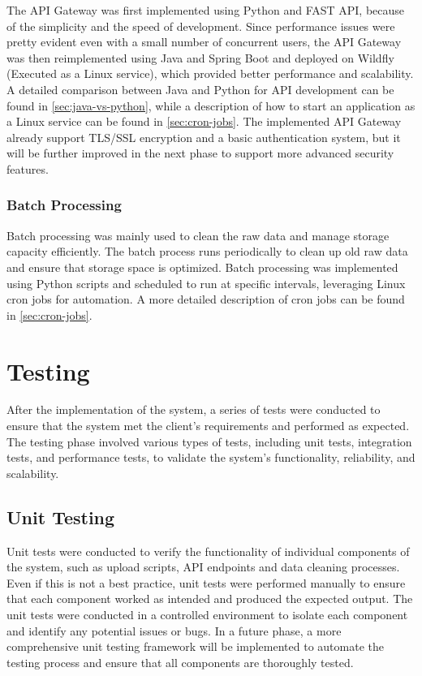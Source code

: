 The API Gateway was first implemented using Python and FAST API, because of the simplicity and the speed of development.
Since performance issues were pretty evident even with a small number of concurrent users, the API Gateway was then reimplemented using Java and Spring Boot and deployed on Wildfly (Executed as a Linux service), which provided better performance and scalability. A detailed comparison between Java and Python for API development can be found in \ref{sec:java-vs-python}, while a description of how to start an application as a Linux service can be found in \ref{sec:cron-jobs}.
The implemented API Gateway already support TLS/SSL encryption and a basic authentication system, but it will be further improved in the next phase to support more advanced security features.

\subsubsection{Batch Processing}
Batch processing was mainly used to clean the raw data and manage storage capacity efficiently. The batch process runs periodically to clean up old raw data and ensure that storage space is optimized. Batch processing was implemented using Python scripts and scheduled to run at specific intervals, leveraging Linux cron jobs for automation. A more detailed description of cron jobs can be found in \ref{sec:cron-jobs}.

\section{Testing}
\label{sec:testing}
After the implementation of the system, a series of tests were conducted to ensure that the system met the client's requirements and performed as expected. The testing phase involved various types of tests, including unit tests, integration tests, and performance tests, to validate the system's functionality, reliability, and scalability.

\subsection{Unit Testing}
Unit tests were conducted to verify the functionality of individual components of the system, such as upload scripts, API endpoints and data cleaning processes. Even if this is not a best practice, unit tests were performed manually to ensure that each component worked as intended and produced the expected output. The unit tests were conducted in a controlled environment to isolate each component and identify any potential issues or bugs. In a future phase, a more comprehensive unit testing framework will be implemented to automate the testing process and ensure that all components are thoroughly tested.

